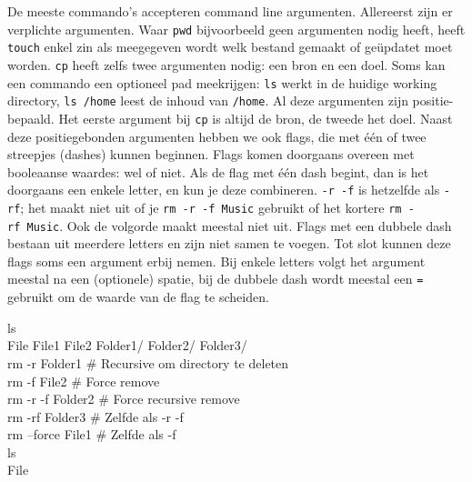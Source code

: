 De meeste commando's accepteren command line argumenten. Allereerst zijn er verplichte argumenten. Waar \texttt{pwd} bijvoorbeeld geen argumenten nodig heeft, heeft \texttt{touch} enkel zin als meegegeven wordt welk bestand gemaakt of geüpdatet moet worden. \texttt{cp} heeft zelfs twee argumenten nodig: een bron en een doel. Soms kan een commando een optioneel pad meekrijgen: \texttt{ls} werkt in de huidige working directory, \texttt{ls\ /home} leest de inhoud van \texttt{/home}. Al deze argumenten zijn positie-bepaald. Het eerste argument bij \texttt{cp} is altijd de bron, de tweede het doel. Naast deze positiegebonden argumenten hebben we ook flags, die met één of twee streepjes (dashes) kunnen beginnen. Flags komen doorgaans overeen met booleaanse waardes: wel of niet. Als de flag met één dash begint, dan is het doorgaans een enkele letter, en kun je deze combineren. \texttt{-r\ -f} is hetzelfde als \texttt{-rf}; het maakt niet uit of je \texttt{rm\ -r\ -f\ Music} gebruikt of het kortere \texttt{rm\ -rf\ Music}. Ook de volgorde maakt meestal niet uit. Flags met een dubbele dash bestaan uit meerdere letters en zijn niet samen te voegen. Tot slot kunnen deze flags soms een argument erbij nemen. Bij enkele letters volgt het argument meestal na een (optionele) spatie, bij de dubbele dash wordt meestal een \texttt{=} gebruikt om de waarde van de flag te scheiden.

\begin{bash}
\userprompt[~/Folder] ls\\
File  File1  File2  Folder1/  Folder2/ Folder3/\\

\userprompt[~/Folder] rm -r Folder1    \# Recursive om directory te deleten\\

\userprompt[~/Folder] rm -f File2      \# Force remove\\

\userprompt[~/Folder] rm -r -f Folder2 \# Force recursive remove\\

\userprompt[~/Folder] rm -rf Folder3   \# Zelfde als -r -f\\

\userprompt[~/Folder] rm --force File1 \# Zelfde als -f\\

\userprompt[~/Folder] ls\\
File\\
\end{bash}

